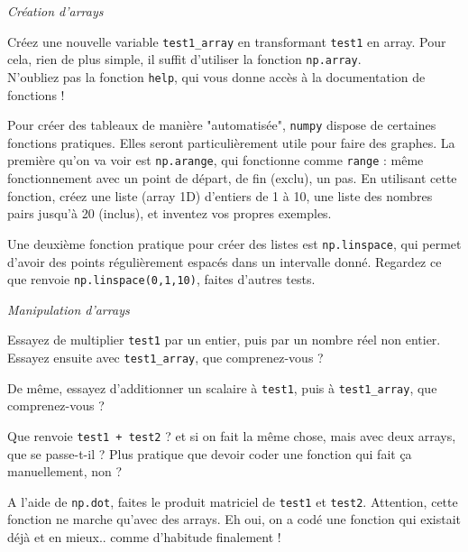 \ques \textit{Création d'arrays}

\ssques Créez une nouvelle variable \verb!test1_array! en transformant \verb!test1! en array. Pour cela, rien de plus simple, il suffit d'utiliser la fonction \verb!np.array!. \\
 N'oubliez pas la fonction \verb!help!, qui vous donne accès à la documentation de fonctions !

\ssques Pour créer des tableaux de manière "automatisée", \verb!numpy! dispose de certaines fonctions pratiques. Elles seront particulièrement utile pour faire des graphes. La première qu'on va voir est \verb!np.arange!, qui fonctionne comme \verb!range! : même fonctionnement avec un point de départ, de fin (exclu), un pas. En utilisant cette fonction, créez une liste (array 1D) d'entiers de 1 à 10, une liste des nombres pairs jusqu'à 20 (inclus), et inventez vos propres exemples.

\ssques Une deuxième fonction pratique pour créer des listes est \verb!np.linspace!, qui permet d'avoir des points régulièrement espacés dans un intervalle donné. Regardez ce que renvoie \verb!np.linspace(0,1,10)!, faites d'autres tests.

\newpage
\ques \textit{Manipulation d'arrays}

\ssques Essayez de multiplier \verb!test1! par un entier, puis par un nombre réel non entier. Essayez ensuite avec \verb!test1_array!, que comprenez-vous ?

\ssques De même, essayez d'additionner un scalaire à \verb!test1!, puis à \verb!test1_array!, que comprenez-vous ?

\ssques Que renvoie \verb!test1 + test2! ? et si on fait la même chose, mais avec deux arrays, que se passe-t-il ? Plus pratique que devoir coder une fonction qui fait ça manuellement, non ?

\ssques A l'aide de \verb!np.dot!, faites le produit matriciel de \verb!test1! et \verb!test2!. Attention, cette fonction ne marche qu'avec des arrays. Eh oui, on a codé une fonction qui existait déjà et en mieux.. comme d'habitude finalement !

